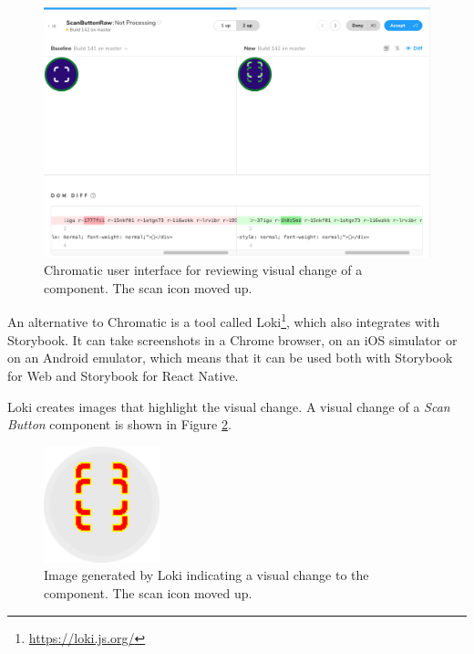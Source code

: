 \documentclass[
  digital, %
  table,   %
  oneside, %
  lof,     %
  lot,     %
]{fithesis3}
\begin{document}
\begin{figure}
    \begin{center}
        \includegraphics[width=\textwidth]{figures/other/chromatic_diff}
    \end{center}
    \caption{Chromatic user interface for reviewing visual change of a component. The scan icon moved up.}
    \label{fig:chromatic_diff}
\end{figure}

An alternative to Chromatic is a tool called Loki\footnote{\url{https://loki.js.org/}}, which also integrates with Storybook. It can take screenshots in a Chrome browser, on an iOS simulator or on an Android emulator, which means that it can be used both with Storybook for Web and Storybook for React Native.

Loki creates images that highlight the visual change. A visual change of a \textit{Scan Button} component is shown in Figure \ref{fig:loki_diff}.

\begin{figure}
    \begin{center}
        \includegraphics[width=0.3\textwidth]{figures/other/loki_diff}
    \end{center}
    \caption{Image generated by Loki indicating a visual change to the component. The scan icon moved up.}
    \label{fig:loki_diff}
\end{figure}
\end{document}
